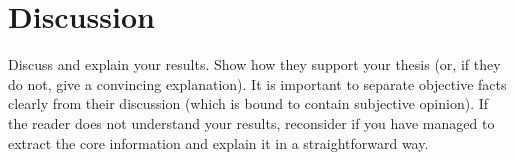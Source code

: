 \chapter{Discussion}

Discuss and explain your results. Show how they support your thesis (or, if they do not, give a convincing explanation). It is important to separate objective facts clearly from their discussion (which is bound to contain subjective opinion). If the reader does not understand your results, reconsider if you have managed to extract the core information and explain it in a straightforward way.

